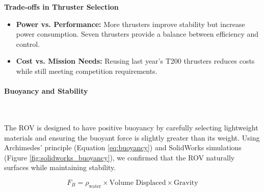 \vspace{0.2cm}
\textbf{Trade-offs in Thruster Selection}
\vspace{-0.5\baselineskip}
\begin{itemize}
    \setlength{\itemsep}{0pt}
    \item \textbf{Power vs. Performance:} More thrusters improve stability but increase power consumption. Seven thrusters provide a balance between efficiency and control.
    \item \textbf{Cost vs. Mission Needs:} Reusing last year’s T200 thrusters reduces costs while still meeting competition requirements.
\end{itemize}

\vspace{-0.3cm}
\paragraph{Buoyancy and Stability} \ \\
\vspace{-0.5cm}

The ROV is designed to have positive buoyancy by carefully selecting lightweight materials and ensuring the buoyant force is slightly greater than its weight. Using Archimedes' principle (Equation \ref{eq:buoyancy}) and SolidWorks simulations (Figure \ref{fig:solidworks_buoyancy}), we confirmed that the ROV naturally surfaces while maintaining stability.

\vspace{-1cm}
\begin{equation}
    \label{eq:buoyancy}
    F_B = \rho_{\text{water}} \times \text{Volume Displaced} \times \text{Gravity}
\end{equation}

